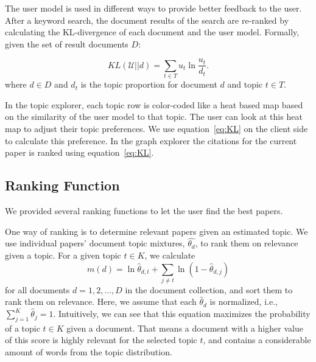 The user model is used in different ways to provide better feedback to
the user. After a keyword search, the document results of the search 
are re-ranked by calculating the KL-divergence of each document and the
user model. Formally, given the set of result documents $D$:

\begin{equation} \label{eq:KL}
KL(\mathcal{U}||d) = \sum_{t \in T} u_t \ln \frac{u_t}{d_t}.
\end{equation}
where $d \in D$ and $d_t$ is the topic proportion for document $d$ and
topic $t \in T$. 

In the topic explorer, each topic row is color-coded like a heat 
based map based on the similarity of the user model to that topic.
The user can look at this heat map to adjust their topic preferences.
We use equation~\ref{eq:KL} on the client side to calculate this preference. 
In the graph explorer the citations for the current paper is ranked
using equation~\ref{eq:KL}.


\subsection{Ranking Function}
We provided several ranking functions to let the user find
the best papers.

One way of ranking is to determine relevant papers 
given an estimated topic. We use individual papers'
document topic mixtures, $\hat{\theta_d}$, to rank them 
on relevance given a topic. For a given 
topic $t \in K$, we calculate
\begin{equation}
m(d) = \ln \hat{\theta}_{d,t} + \sum_{j \neq t}{\ln (1 - \hat{\theta}_{d,j})}
\end{equation}
for all documents $d = 1, 2, \ldots, D$ in 
the document collection, and sort them to rank
them on relevance. Here, we assume that
each $\hat{\theta}_d$ is normalized, 
i.e., $\sum_{j=1}^{K}{\hat{\theta}_j} = 1$.
Intuitively, we can see that this equation maximizes the probability
of a topic $t \in K$ given a document.
That means a document with a higher value of this score is 
highly relevant for the selected topic $t$, and contains 
a considerable amount of words from the topic distribution.    






